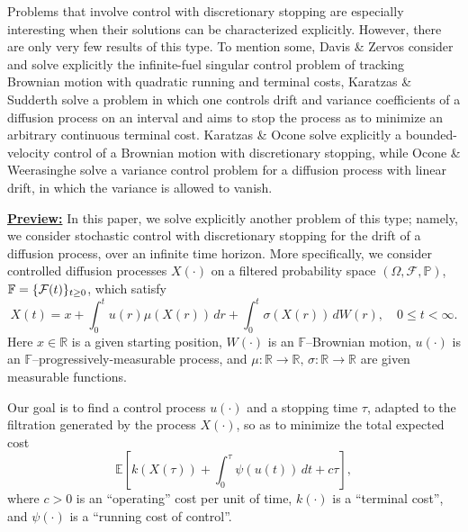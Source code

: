 \documentclass[11pt,tbtags,reqno]{article}
\theoremstyle{definition}
\numberwithin{equation}{section}
\theoremstyle{definition}
\newcommand{\pr}{\mathbb{P}}
\begin{document}
Problems that involve control with discretionary stopping are especially interesting when their solutions can be characterized explicitly. However, there are only very few results of this type. To mention some, Davis \& Zervos \cite{DavZer} consider and solve explicitly the infinite-fuel singular control problem of tracking Brownian motion with quadratic running and terminal costs, Karatzas \& Sudderth \cite{KarSud99} solve a problem in which one controls drift and variance coefficients of a diffusion process on an interval and aims to stop the process as to minimize an arbitrary continuous terminal cost. Karatzas \& Ocone \cite{KarOco02} solve explicitly a bounded-velocity control of a Brownian motion with discretionary stopping, while Ocone \& Weerasinghe \cite{OcoWeer08} solve a variance control problem for a diffusion process with linear drift, in which the variance is allowed to vanish. 


\noindent
\underline{\textbf{Preview:}}
In this paper, we solve explicitly another problem of this type; namely, we consider stochastic control with discretionary stopping for the drift of a diffusion process, over an infinite time horizon. More specifically, we consider controlled diffusion processes $X(\cdot)$ on a filtered probability space $(\Omega, \mathcal{F}, \pr)$, $\mathbb{F} =\nobreak \{\mathcal{F}(t)\}_{t \ge 0}$, which satisfy
\begin{equation}
    X(t) = x + \int_{0}^{t} u(r)\mu(X(r)) \,dr + \int_{0}^{t} \sigma (X(r)) \, dW(r), \quad 0 \le t < \infty.
\end{equation}
Here $x \in \mathbb{R}$ is a given starting position, $W(\cdot)$ is an $\mathbb{F}$--Brownian motion, $u(\cdot)$ is an $\mathbb{F}$--progressively-measurable process, and $\mu: \mathbb{R} \to \mathbb{R}, \, \sigma: \mathbb{R} \to \mathbb{R}$ are given measurable functions. 

Our goal is to find a control process $u(\cdot)$ and a stopping time $\tau$, adapted to the filtration generated by the process $X(\cdot)$, so as to minimize the total expected cost
\begin{equation}\label{objective_to_mininmize}
    \mathbb{E}\left[k(X(\tau))+\int_{0}^{\tau} \psi(u(t)) \, dt + c \tau\right],
\end{equation}
where $c > 0$ is an ``operating'' cost per unit of time, $k(\cdot)$ is a ``terminal cost'', and $\psi(\cdot)$ is a “running cost of control”.
\end{document}
